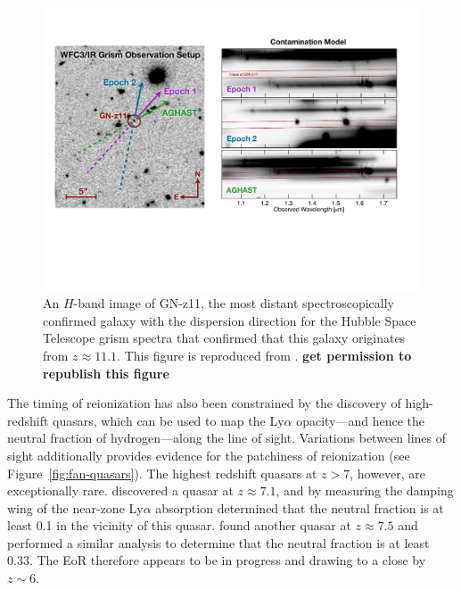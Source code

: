 \begin{bibunit}
\begin{figure}[t]
    \centering
    \includegraphics[width=\textwidth]{figures/chapter1/oesch-gn-z11}
    \caption{
        An $H$-band image of GN-z11, the most distant spectroscopically confirmed galaxy with the
        dispersion direction for the Hubble Space Telescope grism spectra that confirmed that this
        galaxy originates from $z\approx11.1$. This figure is reproduced from
        \citet{2016ApJ...819..129O}. \textbf{get permission to republish this figure}
    }
    \label{fig:oesch-galaxy}
\end{figure}

The timing of reionization has also been constrained by the discovery of high-redshift quasars,
which can be used to map the Ly$\alpha$ opacity---and hence the neutral fraction of hydrogen---along
the line of sight.  Variations between lines of sight additionally provides evidence for the
patchiness of reionization (see Figure~\ref{fig:fan-quasars}). The highest redshift quasars at
$z>7$, however, are exceptionally rare.  \citet{2011Natur.474..616M} discovered a quasar at
$z\approx7.1$, and by measuring the damping wing of the near-zone Ly$\alpha$ absorption determined
that the neutral fraction is at least 0.1 in the vicinity of this quasar.
\citet{2018Natur.553..473B} found another quasar at $z\approx7.5$ and performed a similar analysis
to determine that the neutral fraction is at least 0.33. The EoR therefore appears to be in progress
and drawing to a close by $z\sim 6$.


\end{bibunit}
